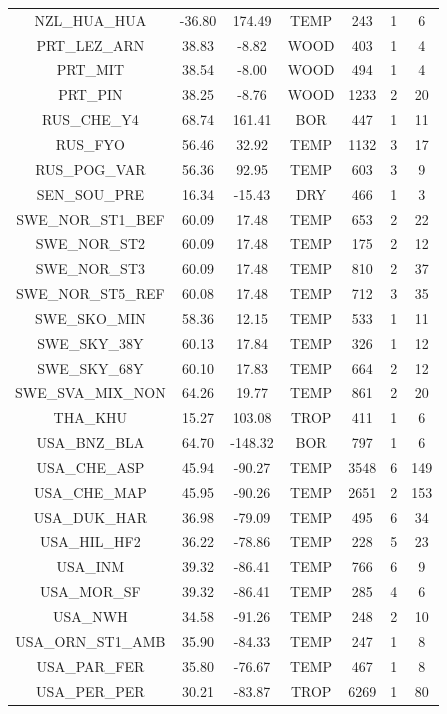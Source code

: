 \documentclass[11pt,twoside]{reedthesis}
\begin{document}
\begin{longtable}[t]{ccccccc}
NZL\_HUA\_HUA & -36.80 & 174.49 & TEMP & 243 & 1 & 6\\
PRT\_LEZ\_ARN & 38.83 & -8.82 & WOOD & 403 & 1 & 4\\
PRT\_MIT & 38.54 & -8.00 & WOOD & 494 & 1 & 4\\
PRT\_PIN & 38.25 & -8.76 & WOOD & 1233 & 2 & 20\\
RUS\_CHE\_Y4 & 68.74 & 161.41 & BOR & 447 & 1 & 11\\
RUS\_FYO & 56.46 & 32.92 & TEMP & 1132 & 3 & 17\\
RUS\_POG\_VAR & 56.36 & 92.95 & TEMP & 603 & 3 & 9\\
SEN\_SOU\_PRE & 16.34 & -15.43 & DRY & 466 & 1 & 3\\
SWE\_NOR\_ST1\_BEF & 60.09 & 17.48 & TEMP & 653 & 2 & 22\\
SWE\_NOR\_ST2 & 60.09 & 17.48 & TEMP & 175 & 2 & 12\\
SWE\_NOR\_ST3 & 60.09 & 17.48 & TEMP & 810 & 2 & 37\\
SWE\_NOR\_ST5\_REF & 60.08 & 17.48 & TEMP & 712 & 3 & 35\\
SWE\_SKO\_MIN & 58.36 & 12.15 & TEMP & 533 & 1 & 11\\
SWE\_SKY\_38Y & 60.13 & 17.84 & TEMP & 326 & 1 & 12\\
SWE\_SKY\_68Y & 60.10 & 17.83 & TEMP & 664 & 2 & 12\\
SWE\_SVA\_MIX\_NON & 64.26 & 19.77 & TEMP & 861 & 2 & 20\\
THA\_KHU & 15.27 & 103.08 & TROP & 411 & 1 & 6\\
USA\_BNZ\_BLA & 64.70 & -148.32 & BOR & 797 & 1 & 6\\
USA\_CHE\_ASP & 45.94 & -90.27 & TEMP & 3548 & 6 & 149\\
USA\_CHE\_MAP & 45.95 & -90.26 & TEMP & 2651 & 2 & 153\\
USA\_DUK\_HAR & 36.98 & -79.09 & TEMP & 495 & 6 & 34\\
USA\_HIL\_HF2 & 36.22 & -78.86 & TEMP & 228 & 5 & 23\\
USA\_INM & 39.32 & -86.41 & TEMP & 766 & 6 & 9\\
USA\_MOR\_SF & 39.32 & -86.41 & TEMP & 285 & 4 & 6\\
USA\_NWH & 34.58 & -91.26 & TEMP & 248 & 2 & 10\\
USA\_ORN\_ST1\_AMB & 35.90 & -84.33 & TEMP & 247 & 1 & 8\\
USA\_PAR\_FER & 35.80 & -76.67 & TEMP & 467 & 1 & 8\\
USA\_PER\_PER & 30.21 & -83.87 & TROP & 6269 & 1 & 80\\

\end{longtable}
\end{document}
